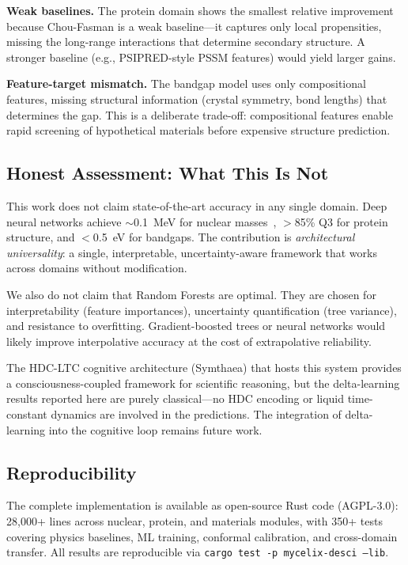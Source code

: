 \documentclass[twocolumn,letterpaper,10pt]{article}
\begin{document}
\textbf{Weak baselines.} The protein domain shows the smallest relative
improvement because Chou-Fasman is a weak baseline---it captures only local
propensities, missing the long-range interactions that determine secondary
structure. A stronger baseline (e.g., PSIPRED-style PSSM features) would
yield larger gains.

\textbf{Feature-target mismatch.} The bandgap model uses only compositional
features, missing structural information (crystal symmetry, bond lengths)
that determines the gap. This is a deliberate trade-off: compositional
features enable rapid screening of hypothetical materials before expensive
structure prediction.

\subsection{Honest Assessment: What This Is Not}

This work does not claim state-of-the-art accuracy in any single domain.
Deep neural networks achieve $\sim$0.1~MeV for nuclear masses~\citep{ame2020},
$>$85\% Q3 for protein structure, and $<$0.5~eV for bandgaps. The contribution
is \emph{architectural universality}: a single, interpretable, uncertainty-aware
framework that works across domains without modification.

We also do not claim that Random Forests are optimal. They are chosen for
interpretability (feature importances), uncertainty quantification (tree
variance), and resistance to overfitting. Gradient-boosted trees or neural
networks would likely improve interpolative accuracy at the cost of
extrapolative reliability.

The HDC-LTC cognitive architecture (Symthaea) that hosts this system provides
a consciousness-coupled framework for scientific reasoning, but the
delta-learning results reported here are purely classical---no HDC encoding
or liquid time-constant dynamics are involved in the predictions. The
integration of delta-learning into the cognitive loop remains future work.

\subsection{Reproducibility}

The complete implementation is available as open-source Rust code (AGPL-3.0):
28,000+ lines across nuclear, protein, and materials modules, with 350+
tests covering physics baselines, ML training, conformal calibration, and
cross-domain transfer. All results are reproducible via
\texttt{cargo test -p mycelix-desci --lib}.
\end{document}
